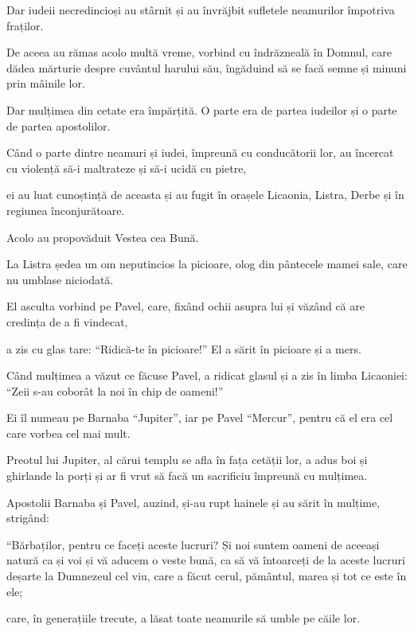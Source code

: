 {Dar iudeii necredincioși au stârnit și au învrăjbit sufletele neamurilor împotriva fraților.

De aceea au rămas acolo multă vreme, vorbind cu îndrăzneală în Domnul, care dădea mărturie despre cuvântul harului său, îngăduind să se facă semne și minuni prin mâinile lor.

Dar mulțimea din cetate era împărțită. O parte era de partea iudeilor și o parte de partea apostolilor.

Când o parte dintre neamuri și iudei, împreună cu conducătorii lor, au încercat cu violență să-i maltrateze și să-i ucidă cu pietre,

ei au luat cunoștință de aceasta și au fugit în orașele Licaonia, Listra, Derbe și în regiunea înconjurătoare.

Acolo au propovăduit Vestea cea Bună.


\par }{\PP {}La Listra ședea un om neputincios la picioare, olog din pântecele mamei sale, care nu umblase niciodată.

El asculta vorbind pe Pavel, care, fixând ochii asupra lui și văzând că are credința de a fi vindecat,

a zis cu glas tare: “Ridică-te în picioare!” El a sărit în picioare și a mers.

Când mulțimea a văzut ce făcuse Pavel, a ridicat glasul și a zis în limba Licaoniei: “Zeii s-au coborât la noi în chip de oameni!”

Ei îl numeau pe Barnaba “Jupiter”, iar pe Pavel “Mercur”, pentru că el era cel care vorbea cel mai mult.

Preotul lui Jupiter, al cărui templu se afla în fața cetății lor, a adus boi și ghirlande la porți și ar fi vrut să facă un sacrificiu împreună cu mulțimea.


\par }{\PP {}Apostolii Barnaba și Pavel, auzind, și-au rupt hainele și au sărit în mulțime, strigând:

“Bărbaților, pentru ce faceți aceste lucruri? Și noi suntem oameni de aceeași natură ca și voi și vă aducem o veste bună, ca să vă întoarceți de la aceste lucruri deșarte la Dumnezeul cel viu, care a făcut cerul, pământul, marea și tot ce este în ele;

care, în generațiile trecute, a lăsat toate neamurile să umble pe căile lor.

}
